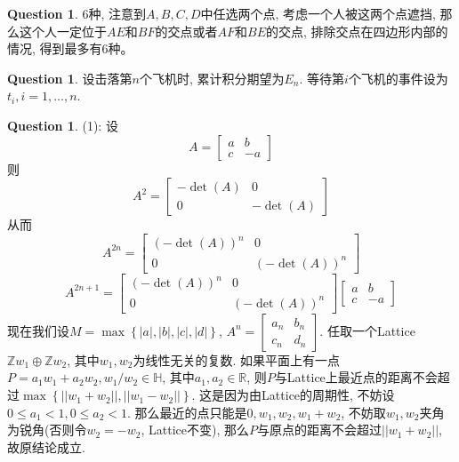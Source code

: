 \documentclass[12pt,a4paper]{ctexart}
\newcommand{\bbrace}[1]{\left\{ #1 \right\} }
\newcommand{\bb}[1]{\mathbb{#1}}
\theoremstyle{definition}
\newtheorem{ques}[defn]{Question}
\begin{document}
\begin{ques}
    $6$种, 注意到$A,B,C,D$中任选两个点, 考虑一个人被这两个点遮挡, 那么这个人一定位于$AE$和$BF$的交点或者$AF$和$BE$的交点, 排除交点在四边形内部的情况, 得到最多有6种。
\end{ques}
\newpage
\begin{ques}
    设击落第$n$个飞机时, 累计积分期望为$E_n$.
    等待第$i$个飞机的事件设为$t_i,i=1,\dots,n$.

\end{ques}
\newpage
\begin{ques}
    (1): 设
    \begin{equation*}
        A=\begin{bmatrix}
            a & b  \\
            c & -a
        \end{bmatrix}
    \end{equation*}
    则
    \begin{equation*}
        A^2=\begin{bmatrix}
            -\det(A) & 0        \\
            0        & -\det(A)
        \end{bmatrix}
    \end{equation*}
    从而
    \begin{equation*}
        A^{2n}=\begin{bmatrix}
            (-\det(A))^n & 0            \\
            0            & (-\det(A))^n
        \end{bmatrix}
    \end{equation*}
    \begin{equation*}
        A^{2n+1}=\begin{bmatrix}
            (-\det(A))^n & 0            \\
            0            & (-\det(A))^n
        \end{bmatrix}\begin{bmatrix}
            a & b  \\
            c & -a
        \end{bmatrix}
    \end{equation*}
    现在我们设$M=\max\bbrace{|a|,|b|,|c|,|d|}$, $A^n=\begin{bmatrix}
            a_n & b_n \\
            c_n & d_n
        \end{bmatrix}$.
    任取一个Lattice $\bb{Z}w_1\oplus\bb{Z}w_2$, 其中$w_1,w_2$为线性无关的复数. 如果平面上有一点$P=a_1w_1+a_2w_2, w_1/w_2\in \bb{H}$, 其中$a_1,a_2\in\bb{R}$,
    则$P$与Lattice上最近点的距离不会超过$\max\bbrace{||w_1+w_2||,||w_1-w_2||}$. 这是因为由Lattice的周期性, 不妨设$0\le a_1<1,0\le a_2<1$. 那么最近的点只能是$0,w_1,w_2,w_1+w_2$,
    不妨取$w_1,w_2$夹角为锐角(否则令$w_2=-w_2$, Lattice不变), 那么$P$与原点的距离不会超过$||w_1+w_2||$, 故原结论成立.
    


\end{ques}
\end{document}
